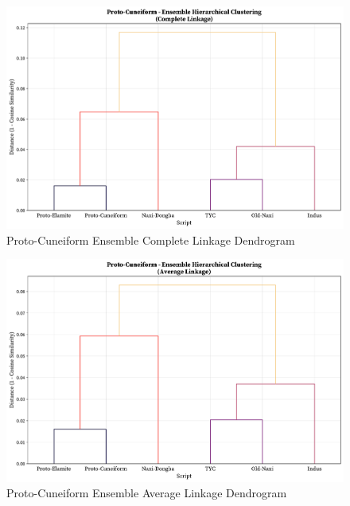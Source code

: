 \documentclass[11pt,a4paper,oneside]{report}
\begin{document}
\begin{figure}[H] 
    \centering
    \includegraphics[width=1\linewidth]{Visualizations/Dendrograms/Proto-Cuneiform/ensemble_dendrogram_complete.pdf}
     \caption*{Proto-Cuneiform Ensemble Complete Linkage Dendrogram}
\end{figure}

\begin{figure}[H] 
    \centering
    \includegraphics[width=1\linewidth]{Visualizations/Dendrograms/Proto-Cuneiform/ensemble_dendrogram_average.pdf}
     \caption*{Proto-Cuneiform Ensemble Average Linkage Dendrogram}
\end{figure}
\end{document}
